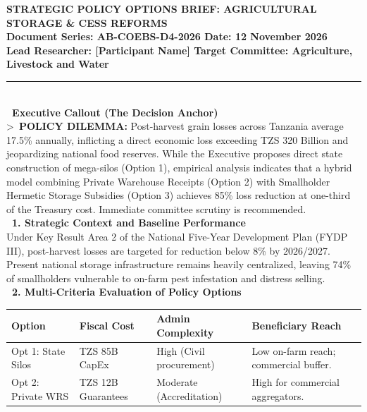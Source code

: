 \documentclass[11pt, a4paper]{report}
\begin{document}
\begin{tcolorbox}[colback=lightgrey, colframe=bordergrey, title=\textbf{Deliverable 4 Preview: \texttt{Day4\_Strategic\_Policy\_Options.md}}]
\small
\textcolor{tanzaniablue}{\textbf{STRATEGIC POLICY OPTIONS BRIEF: AGRICULTURAL STORAGE \& CESS REFORMS}}\\
\textbf{\textcolor{tanzaniablue}{Document Series:} AB-COEBS-D4-2026 \quad \textbar{} \quad \textcolor{suagreen}{\textbf{Date:}} 12 November 2026}\\
\textbf{\textcolor{tanzaniablue}{Lead Researcher:} [Participant Name] \quad \textbar{} \quad \textcolor{tanzaniablue}{\textbf{Target Committee:}} Agriculture, Livestock and Water}\\[0.2cm]
\rule{\textwidth}{0.4pt}\\[0.2cm]
\textcolor{tanzaniablue}{\textbf{\ Executive Callout (The Decision Anchor)}}\\
\textgreater\ \textbf{POLICY DILEMMA:} Post-harvest grain losses across Tanzania average 17.5\% annually, inflicting a direct economic loss exceeding TZS 320 Billion and jeopardizing national food reserves. While the Executive proposes direct state construction of mega-silos (Option 1), empirical analysis indicates that a hybrid model combining Private Warehouse Receipts (Option 2) with Smallholder Hermetic Storage Subsidies (Option 3) achieves 85\% loss reduction at one-third of the Treasury cost. Immediate committee scrutiny is recommended.\\[0.2cm]
\textcolor{tanzaniablue}{\textbf{\ 1. Strategic Context and Baseline Performance}}\\
Under Key Result Area 2 of the National Five-Year Development Plan (FYDP III), post-harvest losses are targeted for reduction below 8\% by 2026/2027. Present national storage infrastructure remains heavily centralized, leaving 74\% of smallholders vulnerable to on-farm pest infestation and distress selling.\\[0.2cm]
\textcolor{tanzaniablue}{\textbf{\ 2. Multi-Criteria Evaluation of Policy Options}}\\
\begin{tabular}{p{2.2cm}p{2.6cm}p{3.2cm}p{3.8cm}}
\toprule
\textbf{Option} & \textbf{Fiscal Cost} & \textbf{Admin Complexity} & \textbf{Beneficiary Reach} \\
\midrule
Opt 1: State Silos & TZS 85B CapEx & High (Civil procurement) & Low on-farm reach; commercial buffer. \\
Opt 2: Private WRS & TZS 12B Guarantees & Moderate (Accreditation) & High for commercial aggregators. \\

\end{tabular}
\end{tcolorbox}
\end{document}
